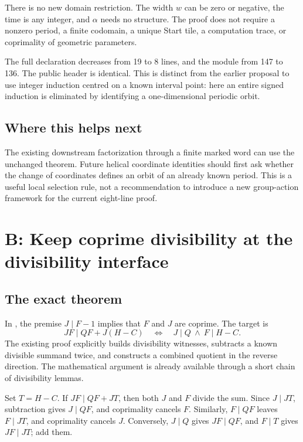 \documentclass[11pt,a4paper]{article}
\newcommand{\code}[1]{\texttt{\detokenize{#1}}}
\newcommand{\src}[1]{\href{https://github.com/VladimirReshetnikov/ProveIt/blob/29936089835c0c55cca81edc86b4fb0c70ce34d5/Computability/DiophantineConsistency/Lean/DiophantineConsistency/#1.lean}{\code{#1}}}
\begin{document}
There is no new domain restriction. The width \(w\) can be zero or negative, the time is any integer, and \(\alpha\) needs no structure. The proof does not require a nonzero period, a finite codomain, a unique Start tile, a computation trace, or coprimality of geometric parameters.

The full declaration decreases from 19 to 8 lines, and the module from 147 to 136. The public header is identical. This is distinct from the earlier proposal to use integer induction centred on a known interval point: here an entire signed induction is eliminated by identifying a one-dimensional periodic orbit.

\subsection{Where this helps next}

The existing downstream factorization through a finite marked word can use the unchanged theorem. Future helical coordinate identities should first ask whether the change of coordinates defines an orbit of an already known period. This is a useful local selection rule, not a recommendation to introduce a new group-action framework for the current eight-line proof.

\section{B: Keep coprime divisibility at the divisibility interface}

\subsection{The exact theorem}

In \src{RatioReparameterization}, the premise \(J\mid F-1\) implies that \(F\) and \(J\) are coprime. The target is
\[
 JF\mid QF+J(H-C)
 \quad\Longleftrightarrow\quad
 J\mid Q\ \land\ F\mid H-C.
\]
The existing proof explicitly builds divisibility witnesses, subtracts a known divisible summand twice, and constructs a combined quotient in the reverse direction. The mathematical argument is already available through a short chain of divisibility lemmas.

Set \(T=H-C\). If \(JF\mid QF+JT\), then both \(J\) and \(F\) divide the sum. Since \(J\mid JT\), subtraction gives \(J\mid QF\), and coprimality cancels \(F\). Similarly, \(F\mid QF\) leaves \(F\mid JT\), and coprimality cancels \(J\). Conversely, \(J\mid Q\) gives \(JF\mid QF\), and \(F\mid T\) gives \(JF\mid JT\); add them.
\end{document}
